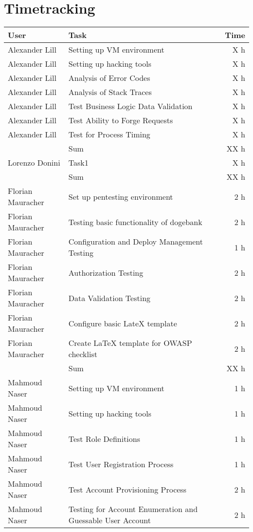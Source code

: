 \chapter{Timetracking}\label{chapter:timetracking}

\begin{table}[htpb]
  \centering
  \begin{tabularx}{\textwidth}{l X r}
    \toprule
      User & Task & Time \\
    \midrule
       Alexander Lill & Setting up VM environment & X h \\
       Alexander Lill & Setting up hacking tools & X h \\
       Alexander Lill & Analysis of Error Codes & X h \\
       Alexander Lill & Analysis of Stack Traces & X h \\
       Alexander Lill & Test Business Logic Data Validation & X h \\
       Alexander Lill & Test Ability to Forge Requests & X h \\
       Alexander Lill & Test for Process Timing & X h \\
      
      
      & Sum & XX h \\
    \midrule
      Lorenzo Donini & Task1 & X h \\
      & Sum & XX h \\
    \midrule
      Florian Mauracher & Set up pentesting environment & 2 h \\
      Florian Mauracher & Testing basic functionality of dogebank & 2 h \\
      Florian Mauracher & Configuration and Deploy Management Testing & 1 h \\
      Florian Mauracher & Authorization Testing & 2 h \\
      Florian Mauracher & Data Validation Testing & 2 h \\
      Florian Mauracher & Configure basic LateX template & 2 h \\
      Florian Mauracher & Create LaTeX template for OWASP checklist & 2 h \\
      & Sum & XX h \\
    \midrule
      Mahmoud Naser & Setting up VM environment & 1 h \\ %
      Mahmoud Naser & Setting up hacking tools & 1 h \\ %
      
      Mahmoud Naser & Test Role Definitions & 1 h \\ %
      Mahmoud Naser & Test User Registration Process & 1 h \\ %
      Mahmoud Naser & Test Account Provisioning Process & 2 h \\ %
      Mahmoud Naser & Testing for Account Enumeration and Guessable User Account & 2 h \\ %
      

\end{tabularx}
\end{table}
